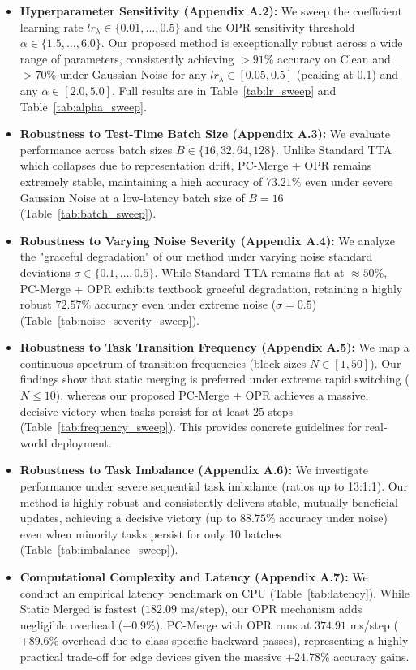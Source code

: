 \documentclass{article}
\theoremstyle{plain}
\theoremstyle{definition}
\theoremstyle{remark}
\begin{document}
\begin{itemize}
    \item \textbf{Hyperparameter Sensitivity (Appendix A.2):} We sweep the coefficient learning rate $lr_\lambda \in \{0.01, \dots, 0.5\}$ and the OPR sensitivity threshold $\alpha \in \{1.5, \dots, 6.0\}$. Our proposed method is exceptionally robust across a wide range of parameters, consistently achieving $>91\%$ accuracy on Clean and $>70\%$ under Gaussian Noise for any $lr_\lambda \in [0.05, 0.5]$ (peaking at $0.1$) and any $\alpha \in [2.0, 5.0]$. Full results are in Table~\ref{tab:lr_sweep} and Table~\ref{tab:alpha_sweep}.
    \item \textbf{Robustness to Test-Time Batch Size (Appendix A.3):} We evaluate performance across batch sizes $B \in \{16, 32, 64, 128\}$. Unlike Standard TTA which collapses due to representation drift, PC-Merge + OPR remains extremely stable, maintaining a high accuracy of $73.21\%$ even under severe Gaussian Noise at a low-latency batch size of $B=16$ (Table~\ref{tab:batch_sweep}).
    \item \textbf{Robustness to Varying Noise Severity (Appendix A.4):} We analyze the "graceful degradation" of our method under varying noise standard deviations $\sigma \in \{0.1, \dots, 0.5\}$. While Standard TTA remains flat at $\approx 50\%$, PC-Merge + OPR exhibits textbook graceful degradation, retaining a highly robust $72.57\%$ accuracy even under extreme noise ($\sigma = 0.5$) (Table~\ref{tab:noise_severity_sweep}).
    \item \textbf{Robustness to Task Transition Frequency (Appendix A.5):} We map a continuous spectrum of transition frequencies (block sizes $N \in [1, 50]$). Our findings show that static merging is preferred under extreme rapid switching ($N \le 10$), whereas our proposed PC-Merge + OPR achieves a massive, decisive victory when tasks persist for at least $25$ steps (Table~\ref{tab:frequency_sweep}). This provides concrete guidelines for real-world deployment.
    \item \textbf{Robustness to Task Imbalance (Appendix A.6):} We investigate performance under severe sequential task imbalance (ratios up to 13:1:1). Our method is highly robust and consistently delivers stable, mutually beneficial updates, achieving a decisive victory (up to $88.75\%$ accuracy under noise) even when minority tasks persist for only 10 batches (Table~\ref{tab:imbalance_sweep}).
    \item \textbf{Computational Complexity and Latency (Appendix A.7):} We conduct an empirical latency benchmark on CPU (Table~\ref{tab:latency}). While Static Merged is fastest ($182.09$ ms/step), our OPR mechanism adds negligible overhead ($+0.9\%$). PC-Merge with OPR runs at $374.91$ ms/step ($+89.6\%$ overhead due to class-specific backward passes), representing a highly practical trade-off for edge devices given the massive $+24.78\%$ accuracy gains.

\end{itemize}
\end{document}
